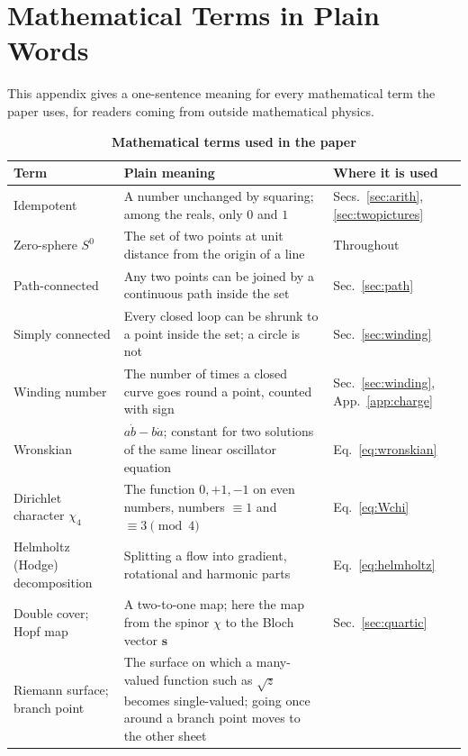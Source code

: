 \documentclass[%
 reprint, amsmath,amssymb, aps, prb, ]{revtex4-2}
\numberwithin{equation}{section}
\newcommand{\Bloch}{\mathbf{s}}
\begin{document}
\section{Mathematical Terms in Plain Words}
\label{app:glossary}

This appendix gives a one-sentence meaning for every mathematical term the paper uses, for readers coming from outside mathematical physics.

\begin{table}[t!]
\centering
\caption{\textbf{Mathematical terms used in the paper}}
\label{tab:glossary}
\renewcommand{\arraystretch}{1.4}
\begin{tabular}{p{3.2cm}p{8.6cm}p{3.8cm}}
\toprule
\textbf{Term} & \textbf{Plain meaning} & \textbf{Where it is used} \\
\midrule
Idempotent
& A number unchanged by squaring; among the reals, only $0$ and $1$
& Secs.~\ref{sec:arith}, \ref{sec:twopictures} \\
\addlinespace[0.3cm]
Zero-sphere $S^0$
& The set of two points at unit distance from the origin of a line
& Throughout \\
\addlinespace[0.3cm]
Path-connected
& Any two points can be joined by a continuous path inside the set
& Sec.~\ref{sec:path} \\
\addlinespace[0.3cm]
Simply connected
& Every closed loop can be shrunk to a point inside the set; a circle is not
& Sec.~\ref{sec:winding} \\
\addlinespace[0.3cm]
Winding number
& The number of times a closed curve goes round a point, counted with sign
& Sec.~\ref{sec:winding}, App.~\ref{app:charge} \\
\addlinespace[0.3cm]
Wronskian
& $a\dot b-b\dot a$; constant for two solutions of the same linear oscillator equation
& Eq.~\eqref{eq:wronskian} \\
\addlinespace[0.3cm]
Dirichlet character $\chi_4$
& The function $0,+1,-1$ on even numbers, numbers $\equiv1$ and $\equiv3\pmod4$
& Eq.~\eqref{eq:Wchi} \\
\addlinespace[0.3cm]
Helmholtz (Hodge) decomposition
& Splitting a flow into gradient, rotational and harmonic parts
& Eq.~\eqref{eq:helmholtz} \\
\addlinespace[0.3cm]
Double cover; Hopf map
& A two-to-one map; here the map from the spinor $\chi$ to the Bloch vector $\Bloch$
& Sec.~\ref{sec:quartic} \\
\addlinespace[0.3cm]
Riemann surface; branch point
& The surface on which a many-valued function such as $\sqrt{z}$ becomes single-valued; going once around a branch point moves to the other sheet

\end{tabular}
\end{table}
\end{document}
